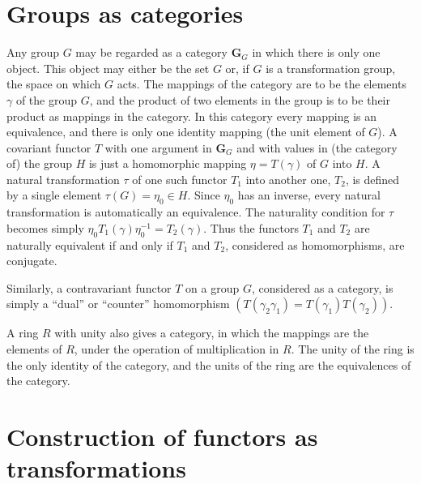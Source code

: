 \documentclass[11pt,a4paper]{report}
\begin{document}
\section{Groups as categories}\label{sec:groups_as_cat}
Any group $G$ may be regarded as a category $\mathbf{G}_G$ in which there is only one object. This object may
either be the set $G$ or, if $G$ is a transformation group, the space on which $G$ acts. The mappings of the 
category are to be the elements $\gamma$ of the group $G$, and the product of two elements in the group is to
be their product as mappings in the category. In this category every mapping is an equivalence, and there is
only one identity mapping (the unit element of $G$). A covariant functor $T$ with one argument in $\mathbf{G}_G$
and with values in (the category of) the group $H$ is just a homomorphic mapping $\eta=T(\gamma)$ of $G$ into $H$.
A natural transformation $\tau$ of one such functor $T_1$ into another one, $T_2$, is defined by a single element
$\tau(G)= \eta_0\in H$. Since $\eta_0$ has an inverse, every natural transformation is automatically an equivalence.
The naturality condition  for $\tau$ becomes simply $\eta_0 T_1(\gamma)\eta_0^{-1}=T_2(\gamma)$.
Thus the functors $T_1$ and $T_2$ are naturally equivalent if and only if $T_1$ and $T_2$, considered as
homomorphisms, are conjugate.

Similarly, a contravariant functor $T$ on a group $G$, considered as a category, is simply a ``dual'' or ``counter''
homomorphism $(T(\gamma_2\gamma_1)=T(\gamma_1)T(\gamma_2))$.

A ring $R$ with unity also gives a category, in which the mappings are the elements of $R$, under the operation of
multiplication in $R$. The unity of the ring is the only identity of the category, and the units of the ring are
the equivalences of the category.

\section{Construction of functors as transformations}\label{sec:func_trans}
\end{document}
